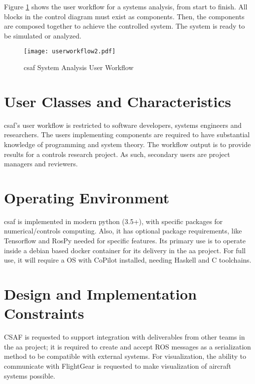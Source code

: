 Figure \ref{fig:uworkflow} shows the user workflow for a systems analysis, from start to finish. All blocks in the control diagram must exist as components. Then, the components are composed together to achieve the controlled system. The system is ready to be simulated or analyzed.

\begin{figure}
\centering
\texttt{[image: userworkflow2.pdf]}
\caption{ \acrshort{csaf} System Analysis User Workflow }
\label{fig:uworkflow}
\end{figure}

\section{User Classes and Characteristics}

\acrshort{csaf}'s user workflow is restricted to software developers, systems engineers and researchers. The users implementing components are required to have substantial knowledge of programming and system theory. The workflow output is to provide results for a controls research project. As such, secondary users are project managers and reviewers. 


\section{Operating Environment}

\acrshort{csaf} is implemented in modern python (3.5+), with specific packages for numerical/controls computing. Also, it has optional package requirements, like Tensorflow and RosPy needed for specific features. Its primary use is to operate inside a debian based docker container for its delivery in the \acrlong{aa} project. For full use, it will require a OS with CoPilot installed, needing Haskell and C toolchains.  

\section{Design and Implementation Constraints}

CSAF is requested to support integration with deliverables from other teams in the \acrshort{aa} project; it is required to create and accept ROS messages as a serialization method to be compatible with external systems. For visualization, the ability to communicate with FlightGear is requested to make visualization of aircraft systems possible. \\

